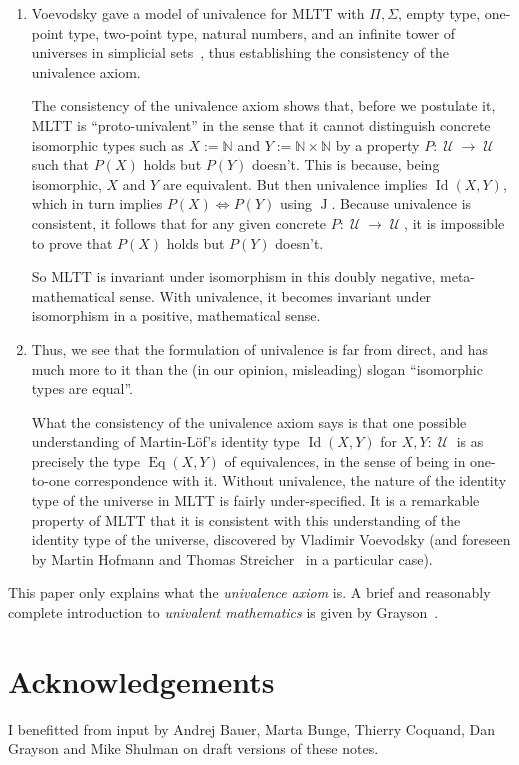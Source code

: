 \documentclass{article}
\newcommand{\N}{\mathbb{N}}
\newcommand{\Id}{\operatorname{Id}}
\newcommand{\J}{\operatorname{J}}
\newcommand{\U}{\operatorname{\mathcal{U}}}
\newcommand{\Eq}{\operatorname{Eq}}
\begin{document}
\begin{enumerate}
  \item Voevodsky gave a model of univalence for MLTT with
    $\Pi,\Sigma$, empty type, one-point type, two-point type, natural
    numbers, and an infinite tower of universes in simplicial
    sets~\cite{kapulkin:lumsdaine:voevodsky,kapulkin:lumsdaine}, thus
    establishing the consistency of the univalence axiom.
    
    The consistency of the univalence axiom shows that, before we
    postulate it, MLTT is ``proto-univalent'' in the sense that it
    cannot distinguish concrete isomorphic types such as $X:=\N$ and
    $Y:=\N\times \N$ by a property $P:\U\to \U$ such that $P(X)$ holds
    but $P(Y)$ doesn't.  This is because, being isomorphic, $X$ and
    $Y$ are equivalent. But then univalence implies $\Id(X,Y)$, which
    in turn implies $P(X) \iff P(Y)$ using $\J$.  Because univalence
    is consistent, it follows that for any given concrete
    $P:\U\to \U$, it is impossible to prove that $P(X)$ holds but
    $P(Y)$ doesn't.

    So MLTT is invariant under isomorphism in this doubly negative,
    meta-mathematical sense. With univalence, it becomes invariant
    under isomorphism in a positive, mathematical sense.

 \item Thus, we see that the formulation of univalence is far from
    direct, and has much more to it than the (in our opinion,
    misleading) slogan ``isomorphic types are equal''.

    What the consistency of the univalence axiom says is that one
    possible understanding of Martin-L\"of's identity type $\Id(X,Y)$ for
    $X,Y:\U$ is as precisely the type $\Eq(X,Y)$ of equivalences, in
    the sense of being in one-to-one correspondence with it. Without
    univalence, the nature of the identity type of the universe in
    MLTT is fairly under-specified. It is a remarkable property of
    MLTT that it is consistent with this understanding of the identity
    type of the universe, discovered by Vladimir Voevodsky (and
    foreseen by Martin Hofmann and Thomas Streicher~\cite{MR1686862}
    in a particular case).
  \end{enumerate}
  This paper only explains what the \emph{univalence axiom} is. A
  brief and reasonably complete introduction to \emph{univalent
    mathematics} is given by Grayson~\cite{grayson}.

  \section*{Acknowledgements}

  I benefitted from input by Andrej Bauer, Marta Bunge, Thierry
  Coquand, Dan Grayson and Mike Shulman on draft versions of these
  notes.
  
\nocite{escardo:ufs}


\end{document}
